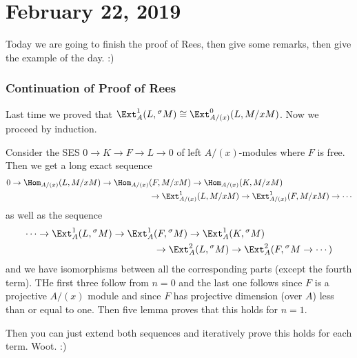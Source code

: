 \documentclass[12pt]{article}
\begin{document}
\section{February 22, 2019}
Today we are going to finish the proof of Rees, then give some remarks, then give the example of the day. :)

\subsubsection{Continuation of Proof of Rees}
Last time we proved that $\Ext_{A}^1(L,{^\sigma M})\cong \Ext_{A/(x)}^0(L,M/xM)$. Now we proceed by induction.

Consider the SES $0\to K\to F\to L\to 0$ of left $A/(x)$-modules where $F$ is free. Then we get a long exact sequence
\begin{align*}
	0\to \Hom_{A/(x)}(L,M/xM)\to \Hom_{A/(x)}&(F,M/xM)\to \Hom_{A/(x)}(K,M/xM)\\
	&\to \Ext^1_{A/(x)}(L,M/xM)\to\Ext^1_{A/(x)}(F,M/xM)\to\cdots
\end{align*}
as well as the sequence
\begin{align*}
	\cdots \to \Ext^1_{A}(L,{^\sigma M})\to \Ext^1_{A}&(F,{^\sigma M})\to \Ext^1_{A}(K,{^\sigma M})\\
	&\to \Ext^2_{A}(L,{^\sigma M})\to \Ext^2_{A}(F,{^\sigma M}\to\cdots)
\end{align*}
and we have isomorphisms between all the corresponding parts (except the fourth term). THe first three 
follow from $n=0$ and the last one follows since $F$ is a projective $A/(x)$ module and since $F$ has projective dimension (over $A$) 
less than or equal to one. Then five lemma proves that this holds for $n=1$.

Then you can just extend both sequences and iteratively prove this holds for each term. Woot. :)
\end{document}
